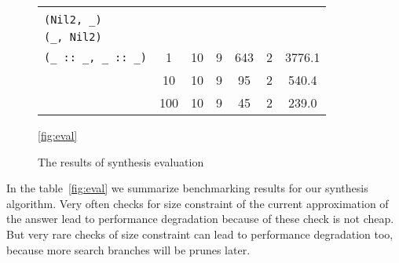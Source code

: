 \begin{figure}[t]
\begin{tabular}{m{3cm}|cc||cccc}
{{\lstinline[basicstyle=\scriptsize]|(_, Nil)|\\[-1mm]
\lstinline[basicstyle=\scriptsize]|(Nil2, _)|\\[-1mm]
\lstinline[basicstyle=\scriptsize]|(_, Nil2)|\\[-1mm]
\lstinline[basicstyle=\scriptsize]|(_ :: _, _ :: _)|}}
         & 1&10&9&643&2&3776.1\\[3mm]
        \cline{2-7}
      &10&10&9&95&2&540.4\\[3mm]
        \cline{2-7}
     &100&10&9&45&2&239.0                         
  \end{tabular}
  \caption{The results of synthesis evaluation}
  \ref{fig:eval}
\begin{comment}
\csvreader[tabular=|r|p{3cm}|p{1cm}|p{1.5cm}||p{1.5cm}|p{1.5cm}|p{1.2cm}|p{1.5cm}|,
table head=\hline & Name & Prunes & Answers requested &Example generated&  1st answer time & Answers found & Total search time \\ \hline\hline,
late after line=\\\hline]%
{bench.csv}{}%
{\thecsvrow & \csvcoli & \csvcolii & \csvcoliii & \csvcoliv & \csvcolv & \csvcolvi& \csvcolvii }
\caption{Benchmarks. Input data is on the left side of double dash $\mid\mid$ and result are on the right}
\label{fig:bench} 
\end{comment}
\end{figure}

In the table~\ref{fig:eval} we summarize benchmarking results for our synthesis algorithm.
Very often checks for size constraint of the current approximation of the answer lead to performance degradation
because of these check is not cheap. But very rare checks of size constraint can lead to performance degradation too,
because more search branches will be prunes later.
